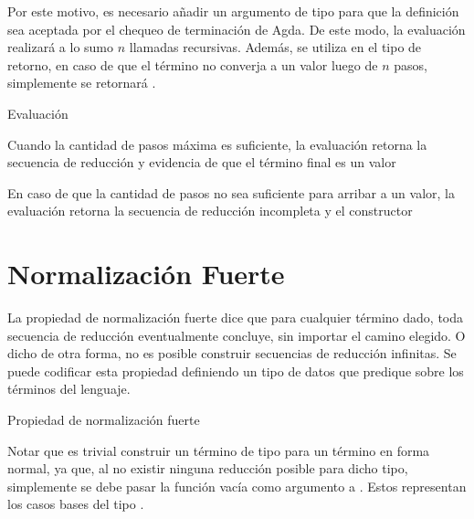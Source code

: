 Por este motivo, es necesario añadir un argumento de tipo  para que la definición sea aceptada por el chequeo de terminación de Agda.
De este modo, la evaluación realizará a lo sumo $n$ llamadas recursivas.
Además, se utiliza  en el tipo de retorno, en caso de que el término no converja a un valor luego de $n$ pasos, simplemente se retornará .


\begin{codigo}
	Evaluación
\end{codigo}

\begin{example}
	Cuando la cantidad de pasos máxima es suficiente, la evaluación retorna la secuencia de reducción y evidencia de que el término final es un valor
\end{example}

\begin{example}
	En caso de que la cantidad de pasos no sea suficiente para arribar a un valor, la evaluación retorna la secuencia de reducción incompleta y el constructor 
\end{example}


\section{Normalización Fuerte}

La propiedad de normalización fuerte dice que para cualquier término dado, toda secuencia de reducción eventualmente concluye, sin importar el camino elegido.
O dicho de otra forma, no es posible construir secuencias de reducción infinitas.
Se puede codificar esta propiedad definiendo un tipo de datos que predique sobre los términos del lenguaje.

\begin{codigo}
	Propiedad de normalización fuerte
\end{codigo}

Notar que es trivial construir un término de tipo  para un término en forma normal, ya que, al no existir ninguna reducción posible para dicho tipo, simplemente se debe pasar la función vacía como argumento a .
Estos representan los casos bases del tipo .

